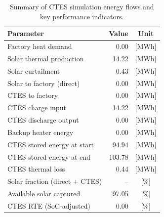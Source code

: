 \renewcommand{\arraystretch}{1.2}
\begin{table}[h]
\centering
\begin{tabular}{l|r c}
\hline
Parameter & Value & Unit \\
\hline
Factory heat demand & 0.00 & [MWh] \\
Solar thermal production & 14.22 & [MWh] \\
Solar curtailment & 0.43 & [MWh] \\
Solar to factory (direct) & 0.00 & [MWh] \\
CTES to factory & 0.00 & [MWh] \\
CTES charge input & 14.22 & [MWh] \\
CTES discharge output & 0.00 & [MWh] \\
Backup heater energy & 0.00 & [MWh] \\
CTES stored energy at start & 94.94 & [MWh] \\
CTES stored energy at end & 103.78 & [MWh] \\
CTES thermal loss & 0.44 & [MWh] \\
\hline
Solar fraction (direct + CTES) & -- & [\%] \\
Available solar captured & 97.05 & [\%] \\
CTES RTE (SoC-adjusted) & 0.00 & [\%] \\
\hline
\end{tabular}
\caption{Summary of CTES simulation energy flows and key performance indicators.}
\label{tab:ctes-simulation-summary}
\end{table}
